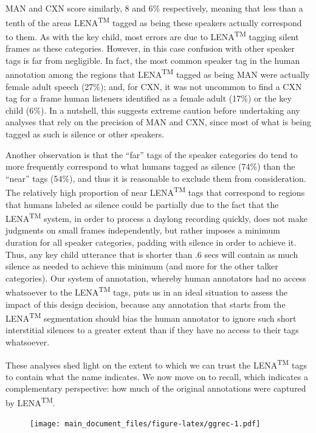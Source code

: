 \documentclass[english,floatsintext,man]{apa6}
\begin{document}
MAN and CXN score similarly, 8 and 6\% respectively, meaning that less
than a tenth of the areas LENA\textsuperscript{TM} tagged as being these
speakers actually correspond to them. As with the key child, most errors
are due to LENA\textsuperscript{TM} tagging silent frames as these
categories. However, in this case confusion with other speaker tags is
far from negligible. In fact, the most common speaker tag in the human
annotation among the regions that LENA\textsuperscript{TM} tagged as
being MAN were actually female adult speech (27\%); and, for CXN, it was
not uncommon to find a CXN tag for a frame human listeners identified as
a female adult (17\%) or the key child (6\%). In a nutshell, this
suggests extreme caution before undertaking any analyses that rely on
the precision of MAN and CXN, since most of what is being tagged as such
is silence or other speakers.

Another observation is that the \enquote{far} tags of the speaker
categories do tend to more frequently correspond to what humans tagged
as silence (74\%) than the \enquote{near} tags (54\%), and thus it is
reasonable to exclude them from consideration. The relatively high
proportion of near LENA\textsuperscript{TM} tags that correspond to
regions that humans labeled as silence could be partially due to the
fact that the LENA\textsuperscript{TM} system, in order to process a
daylong recording quickly, does not make judgments on small frames
independently, but rather imposes a minimum duration for all speaker
categories, padding with silence in order to achieve it. Thus, any key
child utterance that is shorter than .6 secs will contain as much
silence as needed to achieve this minimum (and more for the other talker
categories). Our system of annotation, whereby human annotators had no
access whatsoever to the LENA\textsuperscript{TM} tags, puts us in an
ideal situation to assess the impact of this design decision, because
any annotation that starts from the LENA\textsuperscript{TM}
segmentation should bias the human annotator to ignore such short
interstitial silences to a greater extent than if they have no access to
their tags whatsoever.

These analyses shed light on the extent to which we can trust the
LENA\textsuperscript{TM} tags to contain what the name indicates. We now
move on to recall, which indicates a complementary perspective: how much
of the original annotations were captured by LENA\textsuperscript{TM}.

\begin{figure}
\centering
\texttt{[image: main\_document\_files/figure-latex/ggrec-1.pdf]}
\caption{}
\end{figure}
\end{document}

